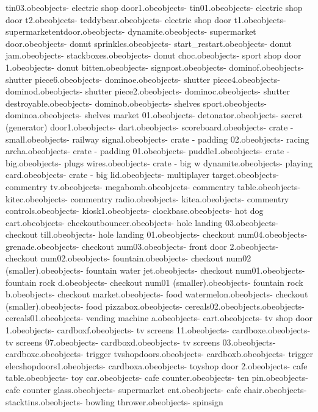 tin03.obe objects\bank - electric shop door1.obe objects\bank - tin01.obe objects\bank - electric shop door t2.obe objects\bank - teddybear.obe objects\bank - electric shop door t1.obe objects\bank - supermarketentdoor.obe objects\bank - dynamite.obe objects\bank - supermarket door.obe objects\bank - donut sprinkles.obe objects\bank - start_restart.obe objects\bank - donut jam.obe objects\bank - stackboxes.obe objects\bank - donut choc.obe objects\bank - sport shop door 1.obe objects\bank - donut bitten.obe objects\bank - signpost.obe objects\bank - dominof.obe objects\bank - shutter piece6.obe objects\bank - dominoe.obe objects\bank - shutter piece4.obe objects\bank - dominod.obe objects\bank - shutter piece2.obe objects\bank - dominoc.obe objects\bank - shutter destroyable.obe objects\bank - dominob.obe objects\bank - shelves sport.obe objects\bank - dominoa.obe objects\bank - shelves market 01.obe objects\bank - detonator.obe objects\bank - secret (generator) door1.obe objects\bank - dart.obe objects\bank - scoreboard.obe objects\bank - crate - small.obe objects\bank - railway signal.obe objects\bank - crate - padding 02.obe objects\bank - racing archa.obe objects\bank - crate - padding 01.obe objects\bank - puddle1.obe objects\bank - crate - big.obe objects\bank - plugs wires.obe objects\bank - crate - big w dynamite.obe objects\bank - playing card.obe objects\bank - crate - big lid.obe objects\bank - multiplayer target.obe objects\bank - commentry tv.obe objects\bank - megabomb.obe objects\bank - commentry table.obe objects\bank - kitec.obe objects\bank - commentry radio.obe objects\bank - kitea.obe objects\bank - commentry controls.obe objects\bank - kiosk1.obe objects\bank - clockbase.obe objects\bank - hot dog cart.obe objects\bank - checkoutbouncer.obe objects\bank - hole landing 03.obe objects\bank - checkout till.obe objects\bank - hole landing 01.obe objects\bank - checkout num04.obe objects\bank - grenade.obe objects\bank - checkout num03.obe objects\bank - front door 2.obe objects\bank - checkout num02.obe objects\bank - fountain.obe objects\bank - checkout num02 (smaller).obe objects\bank - fountain water jet.obe objects\bank - checkout num01.obe objects\bank - fountain rock d.obe objects\bank - checkout num01 (smaller).obe objects\bank - fountain rock b.obe objects\bank - checkout market.obe objects\bank - food watermelon.obe objects\bank - checkout (smaller).obe objects\bank - food pizzabox.obe objects\bank - cereals02.obe objects\trolley.obe objects\bank - cereals01.obe objects\bank - vending machine a.obe objects\bank - cart.obe objects\bank - tv shop door  1.obe objects\bank - cardboxf.obe objects\bank - tv screens 11.obe objects\bank - cardboxe.obe objects\bank - tv screens 07.obe objects\bank - cardboxd.obe objects\bank - tv screens 03.obe objects\bank - cardboxc.obe objects\bank - trigger tvshopdoors.obe objects\bank - cardboxb.obe objects\bank - trigger elecshopdoors1.obe objects\bank - cardboxa.obe objects\bank - toyshop door 2.obe objects\bank - cafe table.obe objects\bank - toy car.obe objects\bank - cafe counter.obe objects\bank - ten pin.obe objects\bank - cafe counter glass.obe objects\bank - supermarket ent.obe objects\bank - cafe chair.obe objects\bank - stacktins.obe objects\bank - bowling thrower.obe objects\bank - spinsign 